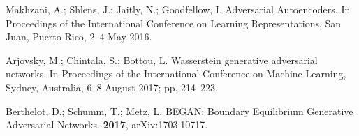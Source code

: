 \documentclass[futureinternet,article,accept,moreauthors,pdftex,10pt,a4paper]{Definitions/mdpi}
\begin{document}
\begin{thebibliography}{999}
Makhzani, A.; Shlens, J.; Jaitly, N.; Goodfellow, I.
\newblock Adversarial Autoencoders.
\newblock  In {Proceedings of the }International Conference on Learning Representations,  San Juan, Puerto Rico, 2--4 May 2016.


Arjovsky, M.; Chintala, S.; Bottou, L.
\newblock Wasserstein generative adversarial networks.
\newblock In {Proceedings of the } International Conference on Machine Learning, Sydney,  Australia, 6--8 August 2017; pp. 214--223.


Berthelot, D.; Schumm, T.; Metz, L.
\newblock BEGAN: Boundary Equilibrium Generative Adversarial Networks.
 {\bf 2017}, arXiv:1703.10717.

\end{thebibliography}
\end{document}
